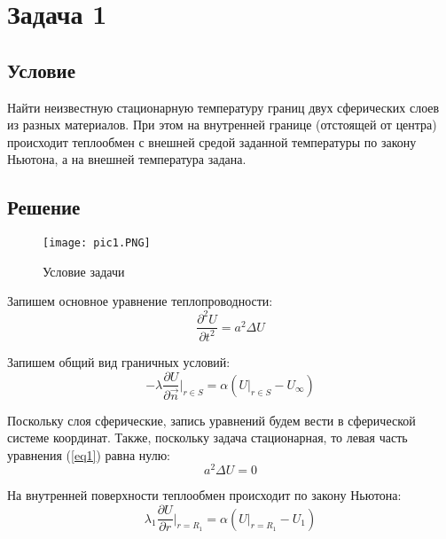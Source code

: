 \section{Задача 1}

\subsection{Условие}

Найти неизвестную стационарную температуру границ двух сферических слоев из разных материалов. При этом на внутренней границе (отстоящей от центра) происходит теплообмен с внешней средой заданной температуры по закону Ньютона, а на внешней температура задана.

\subsection{Решение}

\begin{figure}[H]
    \begin{center}
        \texttt{[image: pic1.PNG]}
        \caption{Условие задачи}
        \label{pic1}
    \end{center}
\end{figure}

Запишем основное уравнение теплопроводности:
\begin{equation}
    \label{eq1}
    \frac{\partial^2 U}{\partial t^2} = a^2 \Delta U
\end{equation}

Запишем общий вид граничных условий:
\begin{equation}
    \label{eq2}
    - \lambda \frac{\partial U}{\partial \vec{n}} \Big|_{r \in S} = \alpha \left( U \Big|_{r \in S} - U_\infty \right)
\end{equation}

Поскольку слоя сферические, запись уравнений будем вести в сферической системе координат. Также, поскольку задача стационарная, то левая часть уравнения (\ref{eq1}) равна нулю:
\begin{equation}
    \label{eq2.1}
    a^2 \Delta U = 0
\end{equation}

На внутренней поверхности теплообмен происходит по закону Ньютона:
\begin{equation}
    \label{eq3}
    \lambda_1 \frac{\partial U}{\partial r} \Big|_{r = R_1} = \alpha (U\Big|_{r = R_1} - U_1)
\end{equation}

